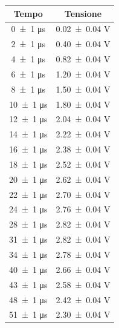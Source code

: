 \documentclass[a4paper]{article}
\begin{document}
\begin{appendices}
\begin{table}[htbp]
    \centering\small
    \begin{tabular}{|c|c|}
    \hline
    Tempo & Tensione \\\hline\hline %
    \num{0 \pm 1} \si{\micro\second} & \num{0.02 \pm 0.04} \si{\volt} \\ %
    \num{2 \pm 1} \si{\micro\second} & \num{0.40 \pm 0.04} \si{\volt} \\ %
    \num{4 \pm 1} \si{\micro\second} & \num{0.82 \pm 0.04} \si{\volt} \\ %
    \num{6 \pm 1} \si{\micro\second} & \num{1.20 \pm 0.04} \si{\volt} \\
    \num{8 \pm 1} \si{\micro\second} & \num{1.50 \pm 0.04} \si{\volt} \\
    \num{10 \pm 1} \si{\micro\second} & \num{1.80 \pm 0.04} \si{\volt} \\
    \num{12 \pm 1} \si{\micro\second} & \num{2.04 \pm 0.04} \si{\volt} \\
    \num{14 \pm 1} \si{\micro\second} & \num{2.22 \pm 0.04} \si{\volt} \\
    \num{16 \pm 1} \si{\micro\second} & \num{2.38 \pm 0.04} \si{\volt} \\
    \num{18 \pm 1} \si{\micro\second} & \num{2.52 \pm 0.04} \si{\volt} \\
    \num{20 \pm 1} \si{\micro\second} & \num{2.62 \pm 0.04} \si{\volt} \\
    \num{22 \pm 1} \si{\micro\second} & \num{2.70 \pm 0.04} \si{\volt} \\
    \num{24 \pm 1} \si{\micro\second} & \num{2.76 \pm 0.04} \si{\volt} \\
    \num{28 \pm 1} \si{\micro\second} & \num{2.82 \pm 0.04} \si{\volt} \\
    \num{31 \pm 1} \si{\micro\second} & \num{2.82 \pm 0.04} \si{\volt} \\
    \num{34 \pm 1} \si{\micro\second} & \num{2.78 \pm 0.04} \si{\volt} \\
    \num{40 \pm 1} \si{\micro\second} & \num{2.66 \pm 0.04} \si{\volt} \\
    \num{43 \pm 1} \si{\micro\second} & \num{2.58 \pm 0.04} \si{\volt} \\
    \num{48 \pm 1} \si{\micro\second} & \num{2.42 \pm 0.04} \si{\volt} \\
    \num{51 \pm 1} \si{\micro\second} & \num{2.30 \pm 0.04} \si{\volt} \\

\end{tabular}
\end{table}
\end{appendices}
\end{document}
